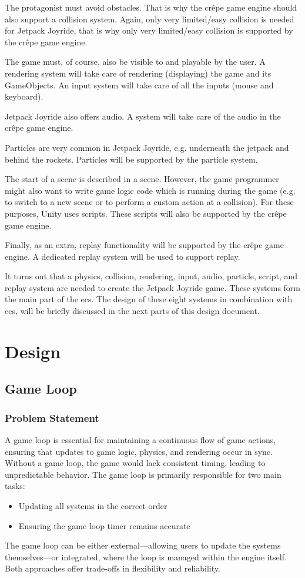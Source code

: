 \documentclass{projdoc}
\begin{document}
The protagonist must avoid obstacles. That is why the cr\^epe game engine should also
support a collision system. Again, only very limited/easy collision is needed for
Jetpack Joyride, that is why only very limited/easy collision is supported by the
cr\^epe game engine.

The game must, of course, also be visible to and playable by the user. A rendering
system will take care of rendering (displaying) the game and its GameObjects. An
input system will take care of all the inputs (mouse and keyboard).

Jetpack Joyride also offers audio. A system will take care of the audio in the
cr\^epe game engine.

Particles are very common in Jetpack Joyride, e.g. underneath the jetpack and behind
the rockets. Particles will be supported by the particle system.

The start of a scene is described in a scene. However, the game programmer might also
want to write game logic code which is running during the game (e.g. to switch to a
new scene or to perform a custom action at a collision). For these purposes, Unity
uses scripts. These scripts will also be supported by the cr\^epe game engine.

Finally, as an extra, replay functionality will be supported by the cr\^epe game
engine. A dedicated replay system will be used to support replay.

It turns out that a physics, collision, rendering, input, audio, particle, script,
and replay system are needed to create the Jetpack Joyride game. These systems form
the main part of the \gls{ecs}. The design of these eight systems in combination with
\gls{ecs}, will be briefly discussed in the next parts of this design document.

\section{Design}
\subsection{Game Loop}

\subsubsection{Problem Statement}
A game loop is essential for maintaining a continuous flow of game actions, ensuring that updates to game logic, physics, and rendering occur in sync. Without a game loop, the game would lack consistent timing, leading to unpredictable behavior. The game loop is primarily responsible for two main tasks:
\begin{itemize}
	\item Updating all systems in the correct order
	\item Ensuring the game loop timer remains accurate
\end{itemize}
The game loop can be either external—allowing users to update the systems themselves—or integrated, where the loop is managed within the engine itself. Both approaches offer trade-offs in flexibility and reliability.
\end{document}
